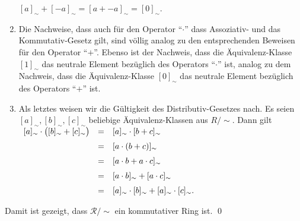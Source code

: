 \begin{enumerate}
      \hspace*{1.3cm}
      $[a]_\sim + [-a]_\sim = [a + -a]_\sim = [0]_\sim$.
\item Die Nachweise, dass auch f\"{u}r den  Operator ``$\cdot$'' dass Assoziativ- und das Kommutativ-Gesetz gilt,
      sind v\"{o}llig analog zu den entsprechenden Beweisen f\"{u}r den Operator ``$+$''.
      Ebenso ist der Nachweis, dass die \"{A}quivalenz-Klasse $[1]_\sim$ das neutrale Element bez\"{u}glich des Operators 
      ``$\cdot$'' ist, analog zu dem Nachweis, dass die \"{A}quivalenz-Klasse $[0]_\sim$ das neutrale Element
      bez\"{u}glich des Operators ``$+$'' ist.
\item Als letztes weisen wir die G\"{u}ltigkeit des Distributiv-Gesetzes nach.
      Es seien  $[a]_\sim, [b]_\sim, [c]_\sim$ beliebige \"{A}quivalenz-Klassen aus $R/\!\sim$. Dann gilt
      \\[0.2cm]
      \hspace*{1.3cm}
      $
      \begin{array}[t]{lcl}
            [a]_\sim \cdot \bigl([b]_\sim + [c]_\sim\bigr) 
      & = & [a]_\sim \cdot [b + c]_\sim                        \\[0.2cm]
      & = & [a \cdot (b + c)]_\sim                             \\[0.2cm]
      & = & [a \cdot b + a \cdot c]_\sim                       \\[0.2cm]
      & = & [a \cdot b]_\sim + [a \cdot c]_\sim                \\[0.2cm]
      & = & [a]_\sim \cdot [b]_\sim + [a]_\sim \cdot [c]_\sim. 
      \end{array}
      $
\end{enumerate}
Damit ist gezeigt, dass $\mathcal{R}/\!\sim$ ein kommutativer Ring ist. \qed

